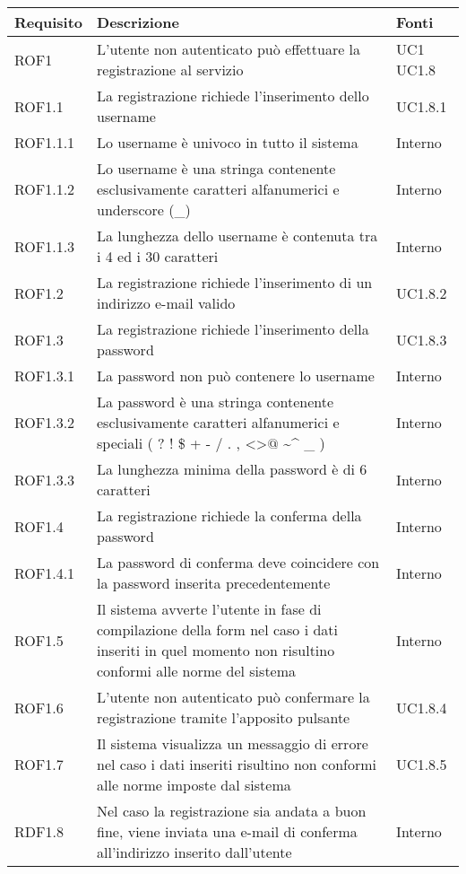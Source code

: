 \begin{center}

	\def\arraystretch{1.5}
	\bgroup
	\begin{longtable}{| p{2.5cm} | p{8cm} | p{2cm} |}

		\hline
		\textbf{Requisito} & \textbf{Descrizione} & \textbf{Fonti} \\
		\hline


		ROF1  &  L'utente non autenticato può effettuare la registrazione al servizio  & UC1 \newline UC1.8 \\
		\hline
		ROF1.1  &  La registrazione richiede l'inserimento dello username  &  UC1.8.1 \\
		\hline
		ROF1.1.1  &  Lo username è univoco in tutto il sistema  &  Interno \\
		\hline
		ROF1.1.2  &  Lo username è una stringa contenente esclusivamente caratteri alfanumerici e underscore (\_)  &  Interno \\
		\hline
		ROF1.1.3  &  La lunghezza dello username è contenuta tra i 4 ed i 30 caratteri  &  Interno \\
		\hline
		ROF1.2  &  La registrazione richiede l'inserimento di un indirizzo e-mail valido &  UC1.8.2 \\
		\hline
		ROF1.3  &  La registrazione richiede l'inserimento della password  &  UC1.8.3 \\
		\hline
		ROF1.3.1  &  La password non può contenere lo username  &  Interno \\
		\hline
		ROF1.3.2  &  La password è una stringa contenente esclusivamente caratteri alfanumerici e speciali ( ? ! \$ + - / . , \textless \textgreater $@$ \textasciitilde \^{} \_ )  &  Interno \\
		\hline
		ROF1.3.3  &  La lunghezza minima della password è di 6 caratteri  &  Interno \\
		\hline
		ROF1.4  &  La registrazione richiede la conferma della password  &  Interno \\
		\hline
		ROF1.4.1  &  La password di conferma deve coincidere con la password inserita precedentemente  &  Interno \\
		\hline
		ROF1.5  &  Il sistema avverte l'utente in fase di compilazione della form nel caso i dati inseriti in quel momento non risultino conformi alle norme del sistema  &  Interno \\
		\hline
		ROF1.6  &  L'utente non autenticato può confermare la registrazione tramite l'apposito pulsante  &  UC1.8.4 \\
		\hline
		ROF1.7  &  Il sistema visualizza un messaggio di errore nel caso i dati inseriti risultino non conformi alle norme imposte dal sistema  &  UC1.8.5 \\
		\hline
		RDF1.8  &  Nel caso la registrazione sia andata a buon fine, viene inviata una e-mail di conferma all'indirizzo inserito dall'utente  &  Interno \\
		\hline


\end{longtable}
\end{center}
